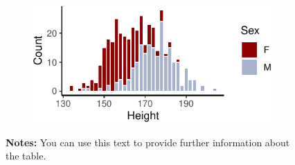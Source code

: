 \documentclass[12pt,a4paper,oneside]{article} %
\begin{document}
\begin{figure}

\caption{\label{fig-hist}Distribution of height (in cm) in random data}

{\centering 

\begin{figure}[H]

{\centering \includegraphics{example_paper_files/figure-pdf/Histogram-1.pdf}

}

\end{figure}

\hypertarget{fig-hist-1}{}
\vspace{-5pt}
\begin{minipage}{0.9\textwidth}
\scriptsize
\singlespacing
\textbf{Notes:} You can use this text to provide further information about the table. \lipsum[66]
\end{minipage}
\vspace{15pt}

}

\end{figure}

\lipsum[2-4]
\end{document}
